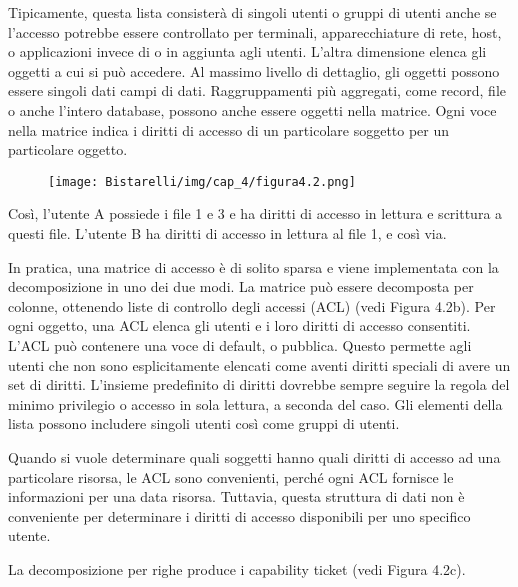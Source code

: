 Tipicamente, questa lista consisterà di singoli utenti o gruppi di utenti anche se l'accesso potrebbe essere controllato per terminali, apparecchiature di rete, host, o applicazioni invece di o in aggiunta agli utenti. L'altra dimensione elenca gli oggetti a cui si può accedere. Al massimo livello di dettaglio, gli oggetti possono essere singoli dati campi di dati. Raggruppamenti più aggregati, come record, file o anche l'intero database, possono anche essere oggetti nella matrice. Ogni voce nella matrice indica i diritti di accesso di un particolare soggetto per un particolare oggetto.

\begin{figure}[H]
	\centering
    \texttt{[image: Bistarelli/img/cap\_4/figura4.2.png]}
\end{figure}

Così, l'utente A possiede i file 1 e 3 e ha diritti di accesso in lettura e scrittura a questi file. L'utente B ha diritti di accesso in lettura al file 1, e così via.

\singlespacing

In pratica, una matrice di accesso è di solito sparsa e viene implementata con la decomposizione in uno dei due modi. La matrice può essere decomposta per colonne, ottenendo liste di controllo degli accessi (ACL) (vedi Figura 4.2b). Per ogni oggetto, una ACL elenca gli utenti e i loro diritti di accesso consentiti. L'ACL può contenere una voce di default, o pubblica. Questo permette agli utenti che non sono esplicitamente elencati come aventi diritti speciali di avere un set di diritti. L'insieme predefinito di diritti dovrebbe sempre seguire la regola del minimo privilegio o accesso in sola lettura, a seconda del caso. Gli elementi della lista possono includere singoli utenti così come gruppi di utenti.

\singlespacing

Quando si vuole determinare quali soggetti hanno quali diritti di accesso ad una particolare risorsa, le ACL sono convenienti, perché ogni ACL fornisce le informazioni per una data risorsa. Tuttavia, questa struttura di dati non è conveniente per determinare i diritti di accesso disponibili per uno specifico utente.

\singlespacing

La decomposizione per righe produce i capability ticket (vedi Figura 4.2c).

\singlespacing

